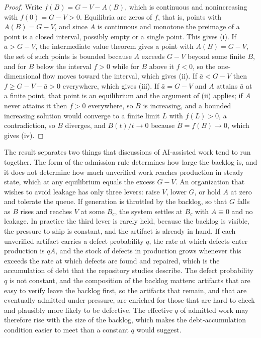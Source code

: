 \documentclass[11pt,a4paper]{article}
\theoremstyle{remark}
\begin{document}
\begin{proof}
Write $f(B)=G-V-A(B)$, which is continuous and nonincreasing with $f(0)=G-V>0$. Equilibria are zeros of $f$, that is, points with $A(B)=G-V$, and since $A$ is continuous and monotone the preimage of a point is a closed interval, possibly empty or a single point. This gives (i). If $\bar a>G-V$, the intermediate value theorem gives a point with $A(B)=G-V$, the set of such points is bounded because $A$ exceeds $G-V$ beyond some finite $B$, and for $B$ below the interval $f>0$ while for $B$ above it $f<0$, so the one-dimensional flow moves toward the interval, which gives (ii). If $\bar a<G-V$ then $f\ge G-V-\bar a>0$ everywhere, which gives (iii). If $\bar a=G-V$ and $A$ attains $\bar a$ at a finite point, that point is an equilibrium and the argument of (ii) applies; if $A$ never attains it then $f>0$ everywhere, so $B$ is increasing, and a bounded increasing solution would converge to a finite limit $L$ with $f(L)>0$, a contradiction, so $B$ diverges, and $B(t)/t\to 0$ because $\dot B=f(B)\to 0$, which gives (iv).
\end{proof}

The result separates two things that discussions of AI-assisted work tend to run together. The form of the admission rule determines how large the backlog is, and it does not determine how much unverified work reaches production in steady state, which at any equilibrium equals the excess $G-V$. An organization that wishes to avoid leakage has only three levers: raise $V$, lower $G$, or hold $A$ at zero and tolerate the queue. If generation is throttled by the backlog, so that $G$ falls as $B$ rises and reaches $V$ at some $B_c$, the system settles at $B_c$ with $A\equiv 0$ and no leakage. In practice the third lever is rarely held, because the backlog is visible, the pressure to ship is constant, and the artifact is already in hand. If each unverified artifact carries a defect probability $q$, the rate at which defects enter production is $qA$, and the stock of defects in production grows whenever this exceeds the rate at which defects are found and repaired, which is the accumulation of debt that the repository studies describe. The defect probability $q$ is not constant, and the composition of the backlog matters: artifacts that are easy to verify leave the backlog first, so the artifacts that remain, and that are eventually admitted under pressure, are enriched for those that are hard to check and plausibly more likely to be defective. The effective $q$ of admitted work may therefore rise with the size of the backlog, which makes the debt-accumulation condition easier to meet than a constant $q$ would suggest.
\end{document}
